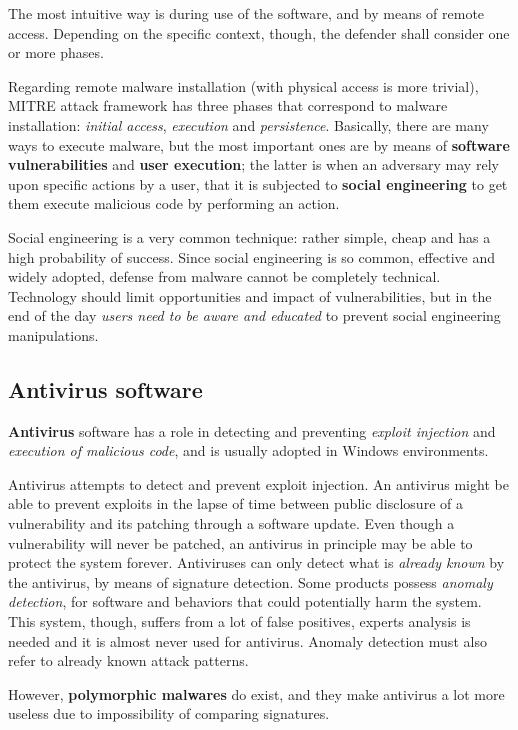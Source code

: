 \documentclass[10pt]{\classname}
\begin{document}
The most intuitive way is during use of the software, and by means of remote
access. Depending on the specific context, though, the defender shall consider
one or more phases.

Regarding remote malware installation (with physical access is more trivial),
MITRE attack framework has three phases that correspond to malware
installation: \emph{initial access}, \emph{execution} and \emph{persistence}.
Basically, there are many ways to execute malware, but the most important ones
are by means of \textbf{software vulnerabilities} and \textbf{user execution};
the latter is when an adversary may rely upon specific actions by a user, that
it is subjected to \textbf{social engineering} to get them execute malicious
code by performing an action.

Social engineering is a very common technique: rather simple, cheap and has a
high probability of success. Since social engineering is so common, effective
and widely adopted, defense from malware cannot be completely technical.
Technology should limit opportunities and impact of vulnerabilities, but in the
end of the day \emph{users need to be aware and educated} to prevent social
engineering manipulations.

\subsection{Antivirus software}

\textbf{Antivirus} software has a role in detecting and preventing
\emph{exploit injection} and \emph{execution of malicious code}, and is usually
adopted in Windows environments.

Antivirus attempts to detect and prevent exploit injection. An antivirus might
be able to prevent exploits in the lapse of time between public disclosure of a
vulnerability and its patching through a software update. Even though a
vulnerability will never be patched, an antivirus in principle may be able to
protect the system forever. Antiviruses can only detect what is \emph{already
known} by the antivirus, by means of signature detection. Some products possess
\emph{anomaly detection}, for software and behaviors that could potentially
harm the system. This system, though, suffers from a lot of false positives,
experts analysis is needed and it is almost never used for antivirus. Anomaly
detection must also refer to already known attack patterns.

However, \textbf{polymorphic malwares} do exist, and they make antivirus
a lot more useless due to impossibility of comparing signatures.
\end{document}

